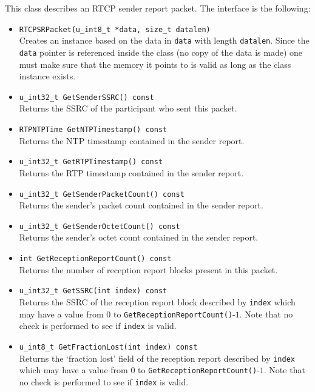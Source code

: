 \documentclass[12pt,a4paper]{article}
\begin{document}
					This class describes an RTCP sender report packet. The interface
					is the following:
					\begin{itemize}
						\item {\tt RTCPSRPacket(u\_int8\_t *data, size\_t datalen)}\\
							Creates an instance based on the data in {\tt data} with
							length {\tt datalen}. Since the {\tt data} pointer
							is referenced inside the class (no copy of the data is
							made) one must make sure that the memory it points to is
							valid as long as the class instance exists.
						\item {\tt u\_int32\_t GetSenderSSRC() const}\\
							Returns the SSRC of the participant who sent this packet.
						\item {\tt RTPNTPTime GetNTPTimestamp() const}\\
							Returns the NTP timestamp contained in the sender report.
						\item {\tt u\_int32\_t GetRTPTimestamp() const}\\
							Returns the RTP timestamp contained in the sender report.
						\item {\tt u\_int32\_t GetSenderPacketCount() const}\\
							Returns the sender's packet count contained in the
							sender report.
						\item {\tt u\_int32\_t GetSenderOctetCount() const}\\
							Returns the sender's octet count contained in the sender
							report.
						\item {\tt int GetReceptionReportCount() const}\\
							Returns the number of reception report blocks present
							in this packet.
						\item {\tt u\_int32\_t GetSSRC(int index) const}\\
							Returns the SSRC of the reception report block described
							by {\tt index} which may have a value from $0$ to
							{\tt GetReceptionReportCount()}-$1$. Note that no
							check is performed to see if {\tt index} is valid.
						\item {\tt u\_int8\_t GetFractionLost(int index) const}\\
							Returns the `fraction lost' field of the reception 
							report described by {\tt index} which may have a value 
							from $0$ to {\tt GetReceptionReportCount()}-$1$. Note that 
							no check is performed to see if {\tt index} is valid.

\end{itemize}
\end{document}
